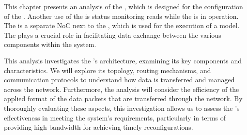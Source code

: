 This chapter presents an analysis of the \confignoc{}, which is designed for the configuration of the \graicore{}.
Another use of the \confignoc{} is status monitoring reads while the \graicore{} is in operation.
The \confignoc{} is a separate NoC next to the \eventnoc{}, which is used for the execution of a model.
The \confignoc{} plays a crucial role in facilitating data exchange between the various components within the system.

This analysis investigates the \confignoc{}'s architecture, examining its key components and characteristics.
We will explore its topology, routing mechanisms, and communication protocols to understand how data is transferred and managed across the network.
Furthermore, the analysis will consider the efficiency of the applied format of the data packets that are transferred through the network.  
By thoroughly evaluating these aspects, this investigation allows us to assess the \confignoc{}'s effectiveness in meeting the system's requirements, particularly in terms of providing high bandwidth for achieving timely reconfigurations.
